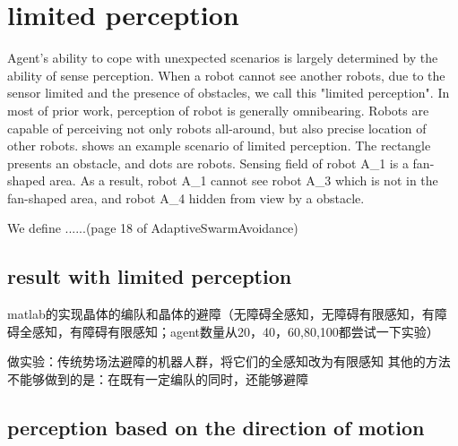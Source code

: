 \section{limited perception}

Agent's ability to cope with unexpected scenarios is largely determined by the ability of sense perception\cite{Distributed adaptive swarm for obstacle avoidance}. 
When a robot cannot see another robots, due to the sensor limited and the presence of obstacles, we call this "limited perception".
In most of prior work, perception of robot is generally omnibearing. 
Robots are capable of perceiving not only robots all-around, but also precise location of other robots\cite{}.
\figurename{} shows an example scenario of  limited perception. The rectangle presents an obstacle, and dots are robots. 
Sensing field of robot A_1 is a fan-shaped area. As a result, robot A_1 cannot see robot A_3 which is not in the fan-shaped area, and robot A_4 hidden from view by a obstacle.

We define ......(page 18 of AdaptiveSwarmAvoidance)

\subsection{result with limited perception}

matlab的实现晶体的编队和晶体的避障（无障碍全感知，无障碍有限感知，有障碍全感知，有障碍有限感知；agent数量从20，40，60,80,100都尝试一下实验）

做实验：传统势场法避障的机器人群，将它们的全感知改为有限感知
其他的方法不能够做到的是：在既有一定编队的同时，还能够避障
\subsection{perception based on the direction of motion}